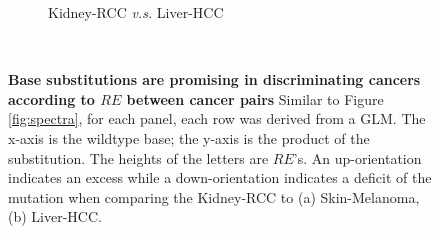 \begin{figure}[ht!]
\begin{subfigure}{.5\textwidth}
    \caption{Kidney-RCC \textit{v.s.} Liver-HCC}
    \label{fig:spectra_kidney_liver}
    \end{subfigure} \\
    \vspace{0.5cm}
    \caption{\textbf{Base substitutions are promising in discriminating cancers according to $RE$ between cancer pairs} Similar to Figure \ref{fig:spectra}, for each panel, each row was derived from a GLM. The x-axis is the wildtype base; the y-axis is the product of the substitution. The heights of the letters are $RE$'s. An up-orientation indicates an excess while a down-orientation indicates a deficit of the mutation when comparing the Kidney-RCC to (a) Skin-Melanoma, (b) Liver-HCC.}
    \label{fig:paired_spectra}
\end{figure}